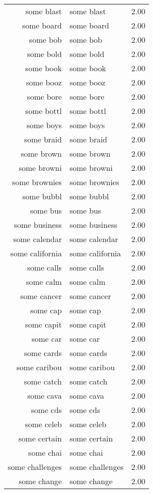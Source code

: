 \begin{table}[ht]
\begin{tabular}{rlr}
  some blast & some blast & 2.00 \\ 
  some board & some board & 2.00 \\ 
  some bob & some bob & 2.00 \\ 
  some bold & some bold & 2.00 \\ 
  some book & some book & 2.00 \\ 
  some booz & some booz & 2.00 \\ 
  some bore & some bore & 2.00 \\ 
  some bottl & some bottl & 2.00 \\ 
  some boys & some boys & 2.00 \\ 
  some braid & some braid & 2.00 \\ 
  some brown & some brown & 2.00 \\ 
  some browni & some browni & 2.00 \\ 
  some brownies & some brownies & 2.00 \\ 
  some bubbl & some bubbl & 2.00 \\ 
  some bus & some bus & 2.00 \\ 
  some business & some business & 2.00 \\ 
  some calendar & some calendar & 2.00 \\ 
  some california & some california & 2.00 \\ 
  some calls & some calls & 2.00 \\ 
  some calm & some calm & 2.00 \\ 
  some cancer & some cancer & 2.00 \\ 
  some cap & some cap & 2.00 \\ 
  some capit & some capit & 2.00 \\ 
  some car & some car & 2.00 \\ 
  some cards & some cards & 2.00 \\ 
  some caribou & some caribou & 2.00 \\ 
  some catch & some catch & 2.00 \\ 
  some cava & some cava & 2.00 \\ 
  some cds & some cds & 2.00 \\ 
  some celeb & some celeb & 2.00 \\ 
  some certain & some certain & 2.00 \\ 
  some chai & some chai & 2.00 \\ 
  some challenges & some challenges & 2.00 \\ 
  some change & some change & 2.00 \\ 

\end{tabular}
\end{table}
